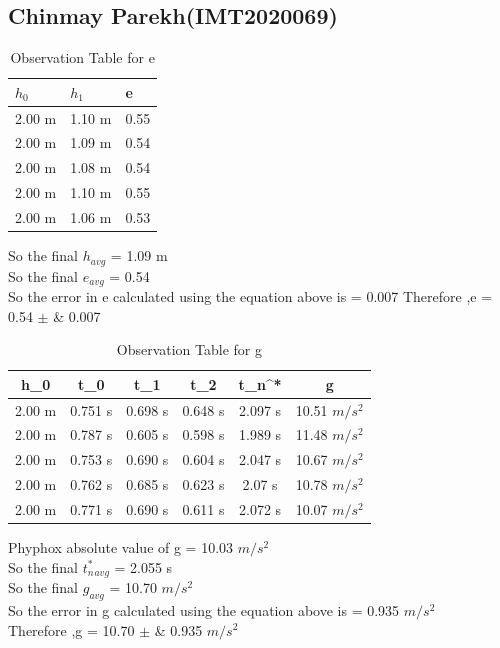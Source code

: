 \documentclass[11pt]{scrartcl} %
\begin{document}
\newpage
\subsection{Chinmay Parekh(IMT2020069)}

\begin{table}[h] %
	\centering %
	\begin{tabular}{l l l}
		\toprule
		\textbf{$h_0$} & \textbf{$h_1$} & \textbf{e} \\
		\midrule
		2.00 m & 1.10 m & 0.55\\
        2.00 m & 1.09 m  & 0.54\\
        2.00 m & 1.08 m  & 0.54\\
        2.00 m & 1.10 m & 0.55 \\
        2.00 m & 1.06 m & 0.53 \\
		\bottomrule
	\end{tabular}
	\caption{Observation Table for e}
\end{table}
So the final $h_{avg}$ = 1.09 m\\
So the final $e_{avg}$ = 0.54\\
So the error in e calculated using the equation above is  = 0.007 \newline
Therefore ,e = 0.54  $\pm$ &  0.007 \\

\begin{table}[h]
\centering
\begin{tabular}{||c c c c c c||} 
\toprule
 \hline
 h_0 & t_0 & t_1 & t_2 & t_n^* & g \\ [0.5ex] 
 \midrule
 \hline\hline
 2.00 m & 0.751 s & 0.698 s  & 0.648 s & 2.097 s & 10.51 $m/s^2$  \\ 
 \hline
 2.00 m & 0.787 s & 0.605 s & 0.598 s & 1.989 s & 11.48 $m/s^2$  \\
 \hline
 2.00 m & 0.753 s & 0.690 s & 0.604 s & 2.047 s  & 10.67 $m/s^2$   \\
 \hline
 2.00 m & 0.762 s & 0.685 s & 0.623 s & 2.07 s  & 10.78 $m/s^2$   \\
 \hline
 2.00 m & 0.771 s & 0.690 s & 0.611 s & 2.072 s  & 10.07 $m/s^2$  \\ [1ex]
 \bottomrule
 \hline
\end{tabular}
\caption{Observation Table for g}
\end{table}
Phyphox absolute value of g = 10.03 $m/s^2$\\
So the final $t_n^*_{avg}$ = 2.055 s\\
So the final $g_{avg}$ = 10.70 $m/s^2$\\
So the error in g calculated using the equation above is  = 0.935 $m/s^2$\\
Therefore ,g = 10.70  $\pm$ &  0.935 $m/s^2$ \\
\newpage
\end{document}

